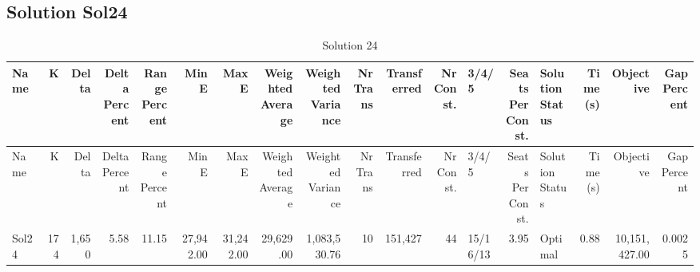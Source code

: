 \documentclass[a4paper]{article}
\begin{document}
\clearpage
\subsection{Solution Sol24}

{\scriptsize
\begin{longtable}{lrrrrrrrrrrrlrlrrr}
\caption{Solution 24}
\\ \toprule
Name &K &Delta &\shortstack{Delta\\Percent} &\shortstack{Range\\Percent} &Min E &Max E &\shortstack{Weighted\\Average} &\shortstack{Weighted\\Variance} &\shortstack{Nr\\Trans} &Transferred &\shortstack{Nr\\Const.} &3/4/5 &\shortstack{Seats\\Per\\Const.} &\shortstack{Solution\\Status} &\shortstack{Time\\(s)} &Objective &\shortstack{Gap\\Percent} \\ \midrule
\endfirsthead
\toprule
Name &K &Delta &\shortstack{Delta\\Percent} &\shortstack{Range\\Percent} &Min E &Max E &\shortstack{Weighted\\Average} &\shortstack{Weighted\\Variance} &\shortstack{Nr\\Trans} &Transferred &\shortstack{Nr\\Const.} &3/4/5 &\shortstack{Seats\\Per\\Const.} &\shortstack{Solution\\Status} &\shortstack{Time\\(s)} &Objective &\shortstack{Gap\\Percent} \\ \midrule
\endhead
\bottomrule
\endfoot
Sol24&174&1,650& 5.58&11.15&27,942.00&31,242.00&29,629.00&1,083,530.76&10&151,427&44&15/16/13& 3.95&Optimal& 0.88&10,151,427.00&0.0025\\ 
\end{longtable}

}
\end{document}
